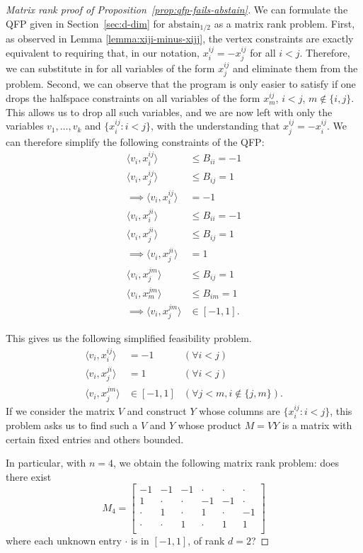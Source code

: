 \documentclass[anon]{colt2020} %
\newcommand{\abstain}[1]{\mathrm{abstain}_{#1}}
\newcommand{\inprod}[2]{\langle #1, #2 \rangle}%
\begin{document}
\begin{proof}[Matrix rank proof of Proposition~\ref{prop:qfp-fails-abstain}]
	We can formulate the QFP given in Section~\ref{sec:d-dim} for $\abstain{1/2}$ as a matrix rank problem.
	First, as observed in Lemma \ref{lemma:xiji-minus-xijj}, the vertex constraints are exactly equivalent to requiring that, in our notation, $x^{ij}_i = - x^{ij}_j$ for all $i<j$.
	Therefore, we can substitute in for all variables of the form $x^{ij}_j$ and eliminate them from the problem.
	Second, we can observe that the program is only easier to satisfy if one drops the halfspace constraints on all variables of the form $x^{ij}_m$, $i < j$, $m \not\in \{i,j\}$.
	This allows us to drop all such variables, and we are now left with only the variables $v_1,\ldots,v_k$ and $\{x^{ij}_i : i<j\}$, with the understanding that $x^{ij}_j = -x^{ij}_i$.
	We can therefore simplify the following constraints of the QFP:
	\begin{align*}
	\inprod{v_i}{x^{ij}_i} &\leq B_{ii} = -1   \\
	\inprod{v_i}{x^{ij}_j} &\leq B_{ij} = 1  \\
	\implies \inprod{v_i}{x^{ij}_i} &= -1  \\
	\inprod{v_i}{x^{ji}_i} &\leq B_{ii} = -1  \\
	\inprod{v_i}{x^{ji}_j} &\leq B_{ij} = 1  \\
	\implies \inprod{v_i}{x^{ji}_j} &= 1  \\
	\inprod{v_i}{x^{jm}_j} &\leq B_{ij} = 1  \\
	\inprod{v_i}{x^{jm}_m} &\leq B_{im} = 1  \\
	\implies \inprod{v_i}{x^{jm}_j} &\in [-1,1] .
	\end{align*}
	
	This gives us the following simplified feasibility problem.
	\begin{align*}
	\inprod{v_i}{x^{ij}_i} &= -1     & (\forall i<j)  \\
	\inprod{v_i}{x^{ji}_j} &= 1      & (\forall i<j)  \\
	\inprod{v_i}{x^{jm}_j} &\in [-1,1]   & (\forall j<m, i\not\in\{j,m\}) .
	\end{align*}
	If we consider the matrix $V$ and construct $Y$ whose columns are $\{x^{ij}_i : i<j\}$, this problem asks us to find such a $V$ and $Y$ whose product $M = VY$ is a matrix with certain fixed entries and others bounded.
	
	In particular, with $n=4$, we obtain the following matrix rank problem: does there exist
	\[
	M_4 = 
	\begin{bmatrix}
	-1 & -1 & -1 & \cdot & \cdot & \cdot \\
	1 & \cdot & \cdot & -1 & -1 & \cdot \\
	\cdot & 1 & \cdot & 1 & \cdot & -1 \\
	\cdot & \cdot & 1 & \cdot & 1 & 1 \\
	\end{bmatrix}
	\]
	where each unknown entry $\cdot$ is in $[-1,1]$, of rank $d=2$?
	

\end{proof}
\end{document}
